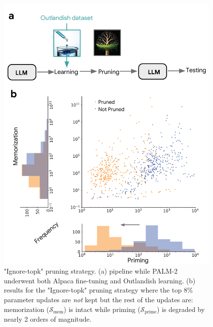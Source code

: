 \documentclass[11pt, a4paper, logo, copyright]{googledeepmind}
\theoremstyle{plain}
\theoremstyle{definition}
\theoremstyle{remark}
\begin{document}
\begin{figure}[h]
\vspace{-2mm}
  \begin{minipage}[c]{0.65\textwidth}
    \centering \includegraphics[scale=.28,clip]{figures/Pruning.pdf}
  \end{minipage}\hfill
  \begin{minipage}[c]{0.35\textwidth}
    \vspace{-1mm}
    \caption{"Ignore-topk" pruning strategy. (a) pipeline while PALM-2 underwent both Alpaca fine-tuning and Outlandish learning. (b) results for the "Ignore-topk" pruning strategy where the top $8\%$ parameter updates are \textit{not} kept but the rest of the updates are: memorization ($\mathcal{S}_\text{mem}$) is intact while priming ($\mathcal{S}_\text{prime}$) is degraded by nearly 2 orders of magnitude. } \label{fig:Pruning}
  \end{minipage}
  \vspace{-4mm}
\end{figure}
\end{document}
